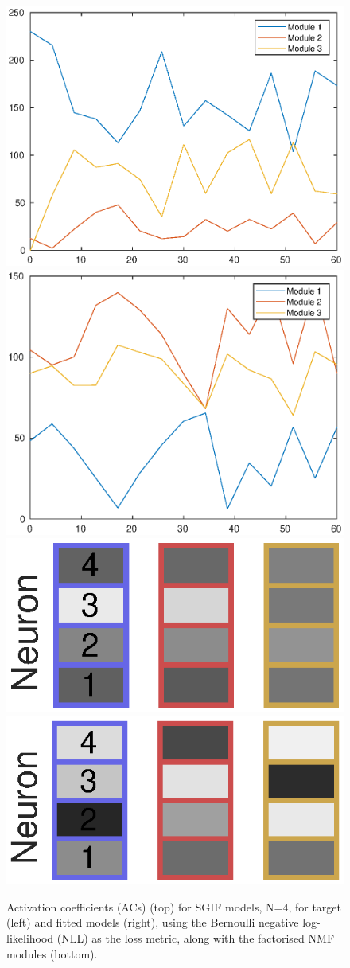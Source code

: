 \documentclass[mphil,deptreport,ianc]{infthesis} %
\begin{document}
\begin{figure}
    \includegraphics[width=0.49\columnwidth]{figures/matlab/NMF/ACs_target_GT_model_mesoGIF_N_4.eps}
    \includegraphics[width=0.49\columnwidth]{figures/matlab/NMF/ACs_nuovo_spikes_mt_microGIF_euid_12-09_16-02-03-400_lfn_bernoulli_nll.eps}
    \centering
    \includegraphics[width=0.3\columnwidth]{figures/matlab/NMF/target_GT_model_mesoGIF_N_4.eps}
    \includegraphics[width=0.3\columnwidth]{figures/matlab/NMF/modules_nuovo_spikes_mt_microGIF_euid_12-09_16-02-03-400_lfn_bernoulli_nll_4.eps}
    \caption{Activation coefficients (ACs) (top) for SGIF models, N=4, for target (left) and fitted models (right), using the Bernoulli negative log-likelihood (NLL) as the loss metric, along with the factorised NMF modules (bottom).}
\end{figure}
\end{document}
